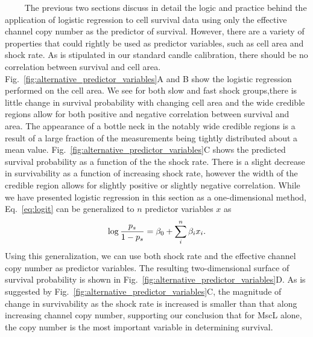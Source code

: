 ~~~~
The
previous
two
sections
discuss
in
detail
the
logic
and
practice
behind
the
application
of
logistic
regression
to
cell
survival
data
using
only
the
effective
channel
copy
number
as the
predictor
of
survival.
However,
there
are a
variety
of
properties
that
could
rightly
be
used
as
predictor
variables,
such
as
cell
area
and
shock
rate.
As is
stipulated
in our
standard
candle
calibration,
there
should
be no
correlation
between
survival
and
cell
area.
Fig.~\ref{fig:alternative_predictor_variables}A
and B
show
the
logistic
regression
performed
on the
cell
area.
We see
for
both
slow
and
fast
shock
groups,there
is
little
change
in
survival
probability
with
changing
cell
area
and
the
wide
credible
regions
allow
for
both
positive
and
negative
correlation
between
survival
and
area.
The
appearance
of a
bottle
neck
in the
notably
wide
credible
regions
is a
result
of a
large
fraction
of the
measurements
being
tightly
distributed
about
a mean
value.
Fig.~\ref{fig:alternative_predictor_variables}C
shows
the
predicted
survival
probability
as a
function
of the
the
shock
rate.
There
is a
slight
decrease
in
survivability
as a
function
of
increasing
shock
rate,
however
the
width
of the
credible
region
allows
for
slightly
positive
or
slightly
negative
correlation.
While
we
have
presented
logistic
regression
in
this
section
as a
one-dimensional
method,
Eq.~\ref{eq:logit}
can be
generalized
to
\(n\)
predictor
variables
\(x\)
as
\begin{equation}
\log {p_s \over 1 - p_s} = \beta_0 + \sum\limits_{i}^n \beta_ix_i.
\label{eq:generalized_logit}\end{equation}
Using
this
generalization,
we can
use
both
shock
rate
and
the
effective
channel
copy
number
as
predictor
variables.
The
resulting
two-dimensional
surface
of
survival
probability
is
shown
in
Fig.~\ref{fig:alternative_predictor_variables}D.
As is
suggested
by
Fig.~\ref{fig:alternative_predictor_variables}C,
the
magnitude
of
change
in
survivability
as the
shock
rate
is
increased
is
smaller
than
that
along
increasing
channel
copy
number,
supporting
our
conclusion
that
for
MscL
alone,
the
copy
number
is the
most
important
variable
in
determining
survival.

